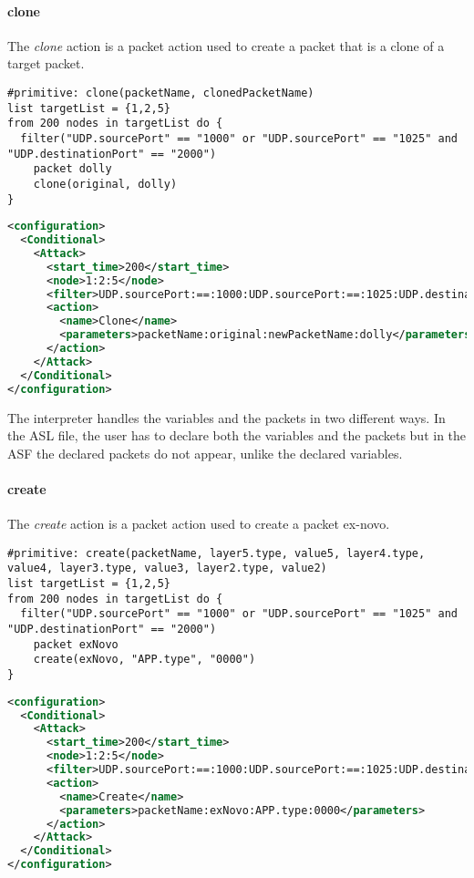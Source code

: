 \paragraph{clone}
The \emph{clone} action is a packet action used to create a packet that is a clone of a target packet.
%
\begin{lstlisting}[language={asl},caption={ASL clone example}]
#primitive: clone(packetName, clonedPacketName)
list targetList = {1,2,5}
from 200 nodes in targetList do {
  filter("UDP.sourcePort" == "1000" or "UDP.sourcePort" == "1025" and "UDP.destinationPort" == "2000")
    packet dolly
    clone(original, dolly)
}
\end{lstlisting}
%
\begin{lstlisting}[language={xml},caption={Interpreter output}]
<configuration>
  <Conditional>
    <Attack>
      <start_time>200</start_time>
      <node>1:2:5</node>
      <filter>UDP.sourcePort:==:1000:UDP.sourcePort:==:1025:UDP.destinationPort:==:2000:AND:OR</filter>
      <action>
        <name>Clone</name>          
        <parameters>packetName:original:newPacketName:dolly</parameters>                        
      </action>
    </Attack>
  </Conditional>
</configuration>
\end{lstlisting}
%
The interpreter handles the variables and the packets in two different ways. 
In the ASL file, the user has to declare both the variables and the packets but in the ASF the declared packets do not appear, unlike the declared variables.

\paragraph{create}
The \emph{create} action is a packet action used to create a packet ex-novo.
%
\begin{lstlisting}[language={asl},caption={ASL create example}]
#primitive: create(packetName, layer5.type, value5, layer4.type, value4, layer3.type, value3, layer2.type, value2)
list targetList = {1,2,5}
from 200 nodes in targetList do {
  filter("UDP.sourcePort" == "1000" or "UDP.sourcePort" == "1025" and "UDP.destinationPort" == "2000")
    packet exNovo
    create(exNovo, "APP.type", "0000")
}
\end{lstlisting}
%
\begin{lstlisting}[language={xml},caption={Interpreter output}]
<configuration>
  <Conditional>
    <Attack>
      <start_time>200</start_time>
      <node>1:2:5</node>
      <filter>UDP.sourcePort:==:1000:UDP.sourcePort:==:1025:UDP.destinationPort:==:2000:AND:OR</filter>
      <action>
        <name>Create</name>
        <parameters>packetName:exNovo:APP.type:0000</parameters>
      </action>
    </Attack>
  </Conditional>
</configuration>
\end{lstlisting}

